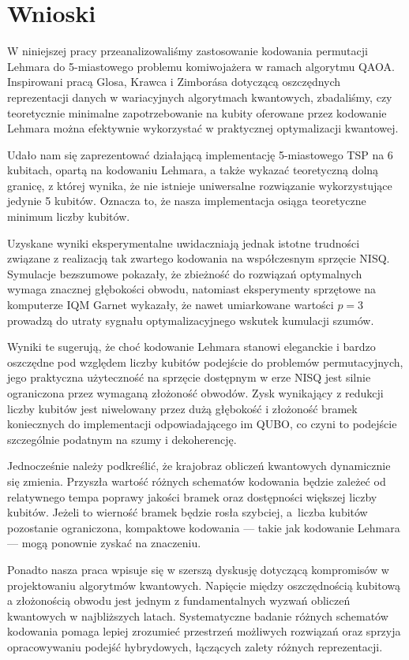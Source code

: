 \section{Wnioski}

W niniejszej pracy przeanalizowaliśmy zastosowanie kodowania permutacji Lehmara do 5-miastowego problemu komiwojażera w ramach algorytmu QAOA. Inspirowani pracą Glosa, Krawca i Zimborása dotyczącą oszczędnych reprezentacji danych w wariacyjnych algorytmach kwantowych, zbadaliśmy, czy teoretycznie minimalne zapotrzebowanie na kubity oferowane przez kodowanie Lehmara można efektywnie wykorzystać w praktycznej optymalizacji kwantowej.

Udało nam się zaprezentować działającą implementację 5-miastowego TSP na 6 kubitach, opartą na kodowaniu Lehmara, a także wykazać teoretyczną dolną granicę, z której wynika, że nie istnieje uniwersalne rozwiązanie wykorzystujące jedynie 5 kubitów. Oznacza to, że nasza implementacja osiąga teoretyczne minimum liczby kubitów.

Uzyskane wyniki eksperymentalne uwidaczniają jednak istotne trudności związane z realizacją tak zwartego kodowania na współczesnym sprzęcie NISQ. Symulacje bezszumowe pokazały, że zbieżność do rozwiązań optymalnych wymaga znacznej głębokości obwodu, natomiast eksperymenty sprzętowe na komputerze IQM Garnet wykazały, że nawet umiarkowane wartości $p=3$ prowadzą do utraty sygnału optymalizacyjnego wskutek kumulacji szumów.

Wyniki te sugerują, że choć kodowanie Lehmara stanowi eleganckie i bardzo oszczędne pod względem liczby kubitów podejście do problemów permutacyjnych, jego praktyczna użyteczność na sprzęcie dostępnym w erze NISQ jest silnie ograniczona przez wymaganą złożoność obwodów. Zysk wynikający z redukcji liczby kubitów jest niwelowany przez dużą głębokość i złożoność bramek koniecznych do implementacji odpowiadającego im QUBO, co czyni to podejście szczególnie podatnym na szumy i dekoherencję.

Jednocześnie należy podkreślić, że krajobraz obliczeń kwantowych dynamicznie się zmienia. Przyszła wartość różnych schematów kodowania będzie zależeć od relatywnego tempa poprawy jakości bramek oraz dostępności większej liczby kubitów. Jeżeli to wierność bramek będzie rosła szybciej, a~liczba kubitów pozostanie ograniczona, kompaktowe kodowania — takie jak kodowanie Lehmara — mogą ponownie zyskać na znaczeniu.

Ponadto nasza praca wpisuje się w szerszą dyskusję dotyczącą kompromisów w projektowaniu algorytmów kwantowych. Napięcie między oszczędnością kubitową a złożonością obwodu jest jednym z fundamentalnych wyzwań obliczeń kwantowych w najbliższych latach. Systematyczne badanie różnych schematów kodowania pomaga lepiej zrozumieć przestrzeń możliwych rozwiązań oraz sprzyja opracowywaniu podejść hybrydowych, łączących zalety różnych reprezentacji.

